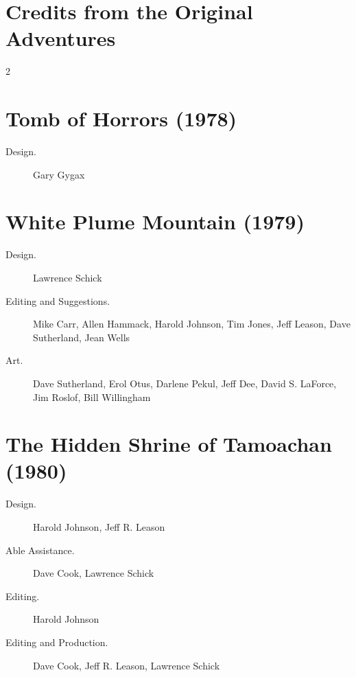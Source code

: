 \documentclass[10pt,a4paper,twoside,bg=print,twocolumn,openany,nodeprecatedcode]{dndbook}
\begin{document}
\section{Credits from the Original Adventures}

\begin{description}
\begin{multicols}{2}
\section{Tomb of Horrors (1978)}

\begin{description}
\item[Design.]
Gary Gygax

\end{description}

\section{White Plume Mountain (1979)}

\begin{description}
\item[Design.]
Lawrence Schick

\item[Editing and Suggestions.]
Mike Carr, Allen Hammack, Harold Johnson, Tim Jones, Jeff Leason, Dave Sutherland, Jean Wells

\item[Art.]
Dave Sutherland, Erol Otus, Darlene Pekul, Jeff Dee, David S. LaForce, Jim Roslof, Bill Willingham

\end{description}

\section{The Hidden Shrine of Tamoachan (1980)}

\begin{description}
\item[Design.]
Harold Johnson, Jeff R. Leason

\item[Able Assistance.]
Dave Cook, Lawrence Schick

\item[Editing.]
Harold Johnson

\item[Editing and Production.]
Dave Cook, Jeff R. Leason, Lawrence Schick


\end{description}
\end{multicols}
\end{description}
\end{document}
